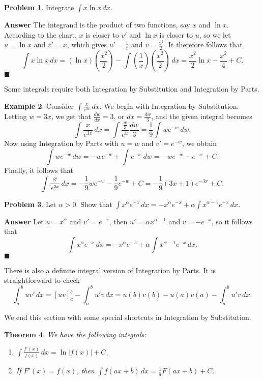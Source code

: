 \documentclass[12pt,letterpaper]{book}
\numberwithin{equation}{section}
\newtheorem{thm}{\textbf{Theorem}}[section]
\theoremstyle{definition}
\newtheorem{problem}[thm]{\textbf{Problem}}
\newtheorem{example}[thm]{\textbf{Example}}
\newenvironment{answer}{\noindent\textbf{Answer}}{\hfill$\blacksquare$\vspace{0.1in}}
\begin{document}
\begin{problem} Integrate $\displaystyle{\int x \ln x\,dx}$.
\end{problem}

\begin{answer}
The integrand is the product of two functions, say $x$ and $\ln x$. According to the chart, $x$ is closer to $v'$ and $\ln x$ is closer to $u$, so we let $u=\ln x$ and $v'=x$, which gives $u'=\frac{1}{x}$ and $v=\frac{x^2}{2}$. It therefore follows that
$$\int x \ln x\,dx=(\ln x)\left(\frac{x^2}{2}\right)-\int \left(\frac{1}{x}\right)\left(\frac{x^2}{2}\right)\,dx=\frac{x^2}{2}\ln x- \frac{x^2}{4}+C.$$
\end{answer}

Some integrals require both Integration by Substitution and Integration by Parts.

\begin{example} Consider $\displaystyle{\int \frac{x}{e^{3x}}\,dx}$. We begin with Integration by Substitution. Letting $w=3x$, we get that $\frac{dw}{dx}=3$, or $dx=\frac{dw}{3}$, and the given integral becomes
$$\int \frac{x}{e^{3x}}\,dx=\int \frac{\frac{w}{3}}{e^w}\frac{dw}{3}=\frac{1}{9}\int we^{-w}\,dw.$$ Now using Integration by Parts with $u=w$ and $v'=e^{-w}$, we obtain
$$\int we^{-w}\,dw=-we^{-w}+\int e^{-w}\,dw=-we^{-w}-e^{-w}+C.$$
Finally, it follows that
$$\int \frac{x}{e^{3x}}\,dx=-\frac{1}{9}we^{-w}-\frac{1}{9}e^{-w}+C=-\frac{1}{9}(3x+1)e^{-3x}+C.$$
\end{example}

\begin{problem}\label{gammaprob}
Let $\alpha>0$. Show that $\displaystyle{\int x^\alpha e^{-x}\,dx=-x^\alpha e^{-x}+\alpha\int x^{\alpha-1}e^{-x}\,dx}$.
\end{problem}

\begin{answer}
Let $u=x^\alpha$ and $v'=e^{-x}$, then $u'=\alpha x^{\alpha-1}$ and $v=-e^{-x}$, so it follows that
$$\int x^\alpha e^{-x}\,dx=-x^\alpha e^{-x}+\alpha\int x^{\alpha-1}e^{-x}\,dx.$$
\end{answer}

There is also a definite integral version of Integration by Parts. It is straightforward to check
$$\int_a^b uv'\,dx=\left[uv\right]_a^b-\int_a^b u'v\,dx=u(b)v(b)-u(a)v(a)-\int_a^b u'v\,dx.$$

We end this section with some special shortcuts in Integration by Substitution.

\begin{thm} We have the following integrals:
\begin{enumerate}
\item $\displaystyle{\int \frac{f'(x)}{f(x)}}\,dx=\ln|f(x)|+C$.
\item If $F'(x)=f(x)$, then $\displaystyle{\int f(ax+b)\,dx=\frac{1}{a}F(ax+b)+C}$.
\end{enumerate}
\end{thm}
\end{document}

